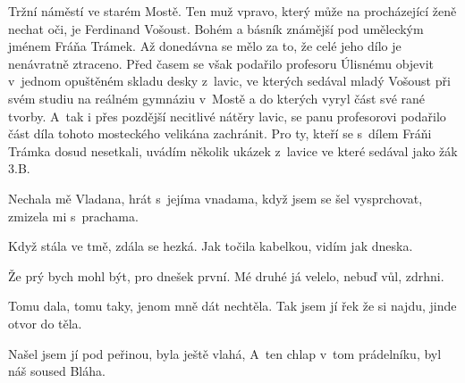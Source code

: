 
Tržní náměstí ve starém Mostě. Ten muž vpravo, který může na
procházející ženě nechat oči, je Ferdinand Vošoust. Bohém a básník
známější pod uměleckým jménem Fráňa Trámek. Až donedávna se mělo za
to, že celé jeho dílo je nenávratně ztraceno. Před časem se však
podařilo profesoru Úlisnému objevit v~jednom opuštěném skladu desky
z~lavic, ve kterých sedával mladý Vošoust při svém studiu na reálném
gymnáziu v~Mostě a do kterých vyryl část své rané tvorby. A~tak i přes
pozdější necitlivé nátěry lavic, se panu profesorovi podařilo část
díla tohoto mosteckého velikána zachránit. Pro ty, kteří se s~dílem
Fráňi Trámka dosud nesetkali, uvádím několik ukázek z~lavice ve které
sedával jako žák 3.B.

Nechala mě Vladana,
hrát s~jejíma vnadama,
když jsem se šel vysprchovat,
zmizela mi s~prachama.

Když stála ve tmě,
zdála se hezká.
Jak točila kabelkou,
vidím jak dneska.

Že prý bych mohl být,
pro dnešek první.
Mé druhé já velelo,
nebuď vůl, zdrhni.

Tomu dala, tomu taky,
jenom mně dát nechtěla.
Tak jsem jí řek že si najdu,
jinde otvor do těla.

Našel jsem jí pod peřinou,
byla ještě vlahá,
A~ten chlap v~tom prádelníku,
byl náš soused Bláha.
